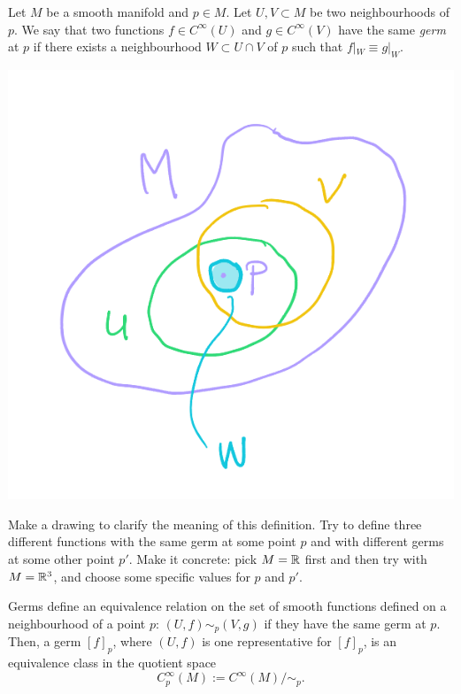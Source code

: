 \begin{definition}
  Let $M$ be a smooth manifold and $p\in M$.
  Let $U,V\subset M$ be two neighbourhoods of $p$.
  We say that two functions $f\in C^\infty(U)$ and $g\in C^\infty(V)$ have the same \emph{germ} at $p$ if there exists a neighbourhood $W\subset U\cap V$ of $p$ such that $f|_W \equiv g|_W$.
\end{definition}
\begin{marginfigure}
  \includegraphics{images/2_3-def_2_3_1.png}
\end{marginfigure}

\begin{exercise}
  Make a drawing to clarify the meaning of this definition.
  Try to define three different functions with the same germ at some point $p$ and with different germs at some other point $p'$.
  Make it concrete: pick $M=\mathbb{R}$ first and then try with $M=\mathbb{R}^3$, and choose some specific values for $p$ and $p'$.
\end{exercise}

Germs define an equivalence relation on the set of smooth functions defined on a neighbourhood of a point $p$: $(U, f) \sim_p (V, g)$ if they have the same germ at $p$. Then, a germ $[f]_p$, where $(U, f)$ is one representative for $[f]_p$, is an equivalence class in the quotient space
\begin{equation}
  C_p^\infty(M) := C^\infty(M)/\!\sim_p.
\end{equation}

